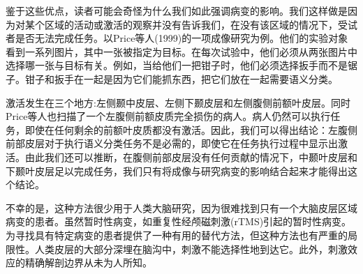 \par
鉴于这些优点，读者可能会奇怪为什么我们如此强调病变的影响。我们这样做是因为对某个区域的活动或激活的观察并没有告诉我们，在没有该区域的情况下，受试者是否无法完成任务。以Price等人(1999)的一项成像研究为例。他们的实验对象看到一系列图片，其中一张被指定为目标。在每次试验中，他们必须从两张图片中选择哪一张与目标有关。例如，当给他们一把钳子时，他们必须选择扳手而不是锯子。钳子和扳手在一起是因为它们能抓东西，把它们放在一起需要语义分类。

\par
激活发生在三个地方:左侧颞中皮层、左侧下颞皮层和左侧腹侧前额叶皮层。同时Price等人也扫描了一个左腹侧前额皮质完全损伤的病人。病人仍然可以执行任务，即使在任何剩余的前额叶皮质都没有激活。因此，我们可以得出结论：左腹侧前部皮层对于执行语义分类任务不是必需的，即使它在任务执行过程中显示出激活。由此我们还可以推断，在腹侧前部皮层没有任何贡献的情况下，中颞叶皮层和下颞叶皮层足以完成任务，我们只有将成像与研究病变的影响结合起来才能得出这个结论。

\par
不幸的是，这种方法很少用于人类大脑研究，因为很难找到只有一个大脑皮层区域病变的患者。虽然暂时性病变，如重复性经颅磁刺激(rTMS)引起的暂时性病变。为寻找具有特定病变的患者提供了一种有用的替代方法，但这种方法也有严重的局限性。人类皮层的大部分深埋在脑沟中，刺激不能选择性地到达它。此外，刺激效应的精确解剖边界从未为人所知。

